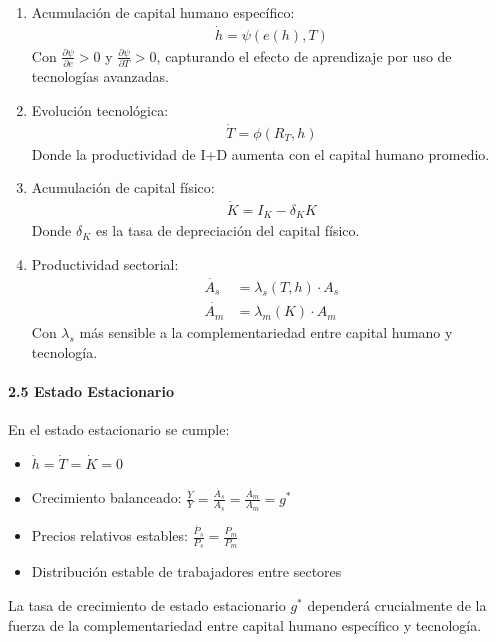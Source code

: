 \documentclass{article}
\theoremstyle{remark}
\theoremstyle{definition}
\begin{document}
\begin{tcolorbox}
\begin{enumerate}
\item Acumulación de capital humano específico:
\begin{align}
\dot{h} = \psi(e(h), T)
\end{align}
Con $\frac{\partial \psi}{\partial e} > 0$ y $\frac{\partial \psi}{\partial T} > 0$, capturando el efecto de aprendizaje por uso de tecnologías avanzadas.

\item Evolución tecnológica:
\begin{align}
\dot{T} = \phi(R_T, h)
\end{align}
Donde la productividad de I+D aumenta con el capital humano promedio.

\item Acumulación de capital físico:
\begin{align}
\dot{K} = I_K - \delta_K K
\end{align}
Donde $\delta_K$ es la tasa de depreciación del capital físico.

\item Productividad sectorial:
\begin{align}
\dot{A_s} &= \lambda_s(T, h) \cdot A_s\\
\dot{A_m} &= \lambda_m(K) \cdot A_m
\end{align}
Con $\lambda_s$ más sensible a la complementariedad entre capital humano y tecnología.
\end{enumerate}

\paragraph{2.5 Estado Estacionario}
En el estado estacionario se cumple:
\begin{itemize}
\item $\dot{h} = \dot{T} = \dot{K} = 0$
\item Crecimiento balanceado: $\frac{\dot{Y}}{Y} = \frac{\dot{A_s}}{A_s} = \frac{\dot{A_m}}{A_m} = g^*$
\item Precios relativos estables: $\frac{\dot{P_s}}{P_s} = \frac{\dot{P_m}}{P_m}$
\item Distribución estable de trabajadores entre sectores
\end{itemize}

La tasa de crecimiento de estado estacionario $g^*$ dependerá crucialmente de la fuerza de la complementariedad entre capital humano específico y tecnología.


\end{tcolorbox}
\end{document}
